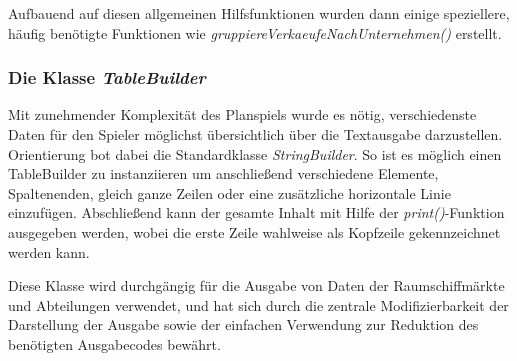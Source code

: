 Aufbauend auf diesen allgemeinen Hilfsfunktionen wurden dann einige speziellere, häufig benötigte Funktionen wie \textit{gruppiereVerkaeufeNachUnternehmen()} erstellt.

\subsubsection{Die Klasse \textit{TableBuilder}}
Mit zunehmender Komplexität des Planspiels wurde es nötig, verschiedenste Daten für den Spieler möglichst übersichtlich über die Textausgabe darzustellen. Orientierung bot dabei die Standardklasse \textit{StringBuilder}. So ist es möglich einen TableBuilder zu instanziieren um anschließend verschiedene Elemente, Spaltenenden, gleich ganze Zeilen oder eine zusätzliche horizontale Linie einzufügen. Abschließend kann der gesamte Inhalt mit Hilfe der \textit{print()}-Funktion ausgegeben werden, wobei die erste Zeile wahlweise als Kopfzeile gekennzeichnet werden kann.

Diese Klasse wird durchgängig für die Ausgabe von Daten der Raumschiffmärkte und Abteilungen verwendet, und hat sich durch die zentrale Modifizierbarkeit der Darstellung der Ausgabe sowie der einfachen Verwendung zur Reduktion des benötigten Ausgabecodes bewährt.